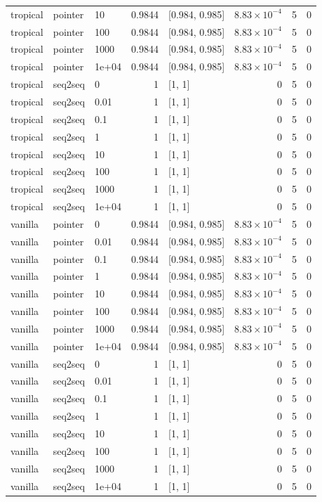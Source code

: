 \documentclass[10pt]{article}
\begin{document}
{\begin{longtable}{lllrlrrr}
tropical & pointer & 10 & 0.9844 & [0.984, 0.985] & $8.83\times10^{-4}$ & 5 & 0\\
tropical & pointer & 100 & 0.9844 & [0.984, 0.985] & $8.83\times10^{-4}$ & 5 & 0\\
tropical & pointer & 1000 & 0.9844 & [0.984, 0.985] & $8.83\times10^{-4}$ & 5 & 0\\
tropical & pointer & 1e+04 & 0.9844 & [0.984, 0.985] & $8.83\times10^{-4}$ & 5 & 0\\
tropical & seq2seq & 0 & 1 & [1, 1] & 0 & 5 & 0\\
tropical & seq2seq & 0.01 & 1 & [1, 1] & 0 & 5 & 0\\
tropical & seq2seq & 0.1 & 1 & [1, 1] & 0 & 5 & 0\\
tropical & seq2seq & 1 & 1 & [1, 1] & 0 & 5 & 0\\
tropical & seq2seq & 10 & 1 & [1, 1] & 0 & 5 & 0\\
tropical & seq2seq & 100 & 1 & [1, 1] & 0 & 5 & 0\\
tropical & seq2seq & 1000 & 1 & [1, 1] & 0 & 5 & 0\\
tropical & seq2seq & 1e+04 & 1 & [1, 1] & 0 & 5 & 0\\
vanilla & pointer & 0 & 0.9844 & [0.984, 0.985] & $8.83\times10^{-4}$ & 5 & 0\\
vanilla & pointer & 0.01 & 0.9844 & [0.984, 0.985] & $8.83\times10^{-4}$ & 5 & 0\\
vanilla & pointer & 0.1 & 0.9844 & [0.984, 0.985] & $8.83\times10^{-4}$ & 5 & 0\\
vanilla & pointer & 1 & 0.9844 & [0.984, 0.985] & $8.83\times10^{-4}$ & 5 & 0\\
vanilla & pointer & 10 & 0.9844 & [0.984, 0.985] & $8.83\times10^{-4}$ & 5 & 0\\
vanilla & pointer & 100 & 0.9844 & [0.984, 0.985] & $8.83\times10^{-4}$ & 5 & 0\\
vanilla & pointer & 1000 & 0.9844 & [0.984, 0.985] & $8.83\times10^{-4}$ & 5 & 0\\
vanilla & pointer & 1e+04 & 0.9844 & [0.984, 0.985] & $8.83\times10^{-4}$ & 5 & 0\\
vanilla & seq2seq & 0 & 1 & [1, 1] & 0 & 5 & 0\\
vanilla & seq2seq & 0.01 & 1 & [1, 1] & 0 & 5 & 0\\
vanilla & seq2seq & 0.1 & 1 & [1, 1] & 0 & 5 & 0\\
vanilla & seq2seq & 1 & 1 & [1, 1] & 0 & 5 & 0\\
vanilla & seq2seq & 10 & 1 & [1, 1] & 0 & 5 & 0\\
vanilla & seq2seq & 100 & 1 & [1, 1] & 0 & 5 & 0\\
vanilla & seq2seq & 1000 & 1 & [1, 1] & 0 & 5 & 0\\
vanilla & seq2seq & 1e+04 & 1 & [1, 1] & 0 & 5 & 0\\
\bottomrule
\end{longtable}
}
\end{document}
